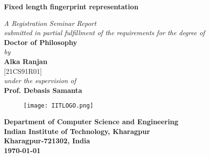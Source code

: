 % 

\thispagestyle{empty}
\vspace*{0.4cm}
\begin{center}
	{\huge \bf Fixed length fingerprint representation}
	
	\vspace*{0.8cm} {\em A Registration Seminar Report\\ submitted in partial fulfillment of the requirements for the degree of}\\
	\vspace*{0.5cm}
	{\Large {\bf Doctor of Philosophy}}\\
	\vspace*{0.4cm}
	{\em by}\\
	\vspace*{0.4cm}
	{\Large {\bf Alka Ranjan}}\\
	\vspace*{0.3cm}
	{\large [21CS91R01]}\\
	
	\vspace*{0.4cm}
	{\em under the supervision of }\\
	\vspace*{0.3cm}
	\Large {{\bf Prof. Debasis Samanta}}\\
	\vspace*{0.1cm}
	
	\vspace*{1.5cm}
	
	\begin{figure}[htbp]
		\centerline{\texttt{[image: IITLOGO.png]}}
	\end{figure}
	\vspace*{1cm}
	\Large {{\bf Department of Computer Science and Engineering\\
			\vspace*{0.1cm}
			Indian Institute of Technology, Kharagpur\\
			\vspace*{0.1cm}
			Kharagpur-721302, India\\
			\vspace*{0.1cm}
			\today}} 
\end{center}
\newpage

% 
